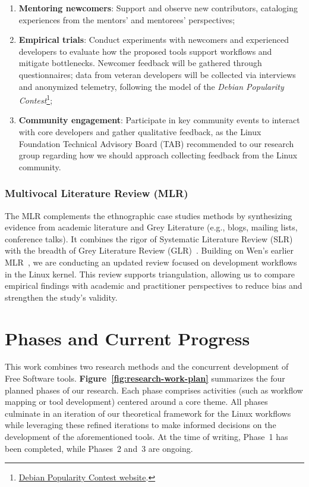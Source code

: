 \documentclass[sigconf]{acmart} %
\begin{document}
\begin{enumerate}
    \item \textbf{Mentoring newcomers}: Support and observe new contributors,
    cataloging experiences from the mentors' and mentorees' perspectives;
    \item \textbf{Empirical trials}: Conduct experiments with newcomers and
    experienced developers to evaluate how the proposed tools support workflows
    and mitigate bottlenecks. Newcomer feedback will be gathered through
    questionnaires; data from veteran developers will be collected via
    interviews and anonymized telemetry, following the model of the
    \textit{Debian Popularity
    Contest}\footnote{\href{https://popcon.debian.org/}{Debian Popularity
    Contest website}.};
    \item \textbf{Community engagement}: Participate in key community events to
    interact with core developers and gather qualitative feedback, as the Linux
    Foundation Technical Advisory Board (TAB) recommended to our research group
    regarding how we should approach collecting feedback from the Linux
    community.
\end{enumerate}

\subsubsection{Multivocal Literature Review (MLR)}

The MLR complements the ethnographic case studies methods by synthesizing
evidence from academic literature and Grey Literature (e.g., blogs, mailing
lists, conference talks). It combines the rigor of Systematic Literature Review
(SLR) with the breadth of Grey Literature Review (GLR)~\cite{vahid2018-mlr}.
Building on Wen's earlier MLR~\cite{wen2021-masterthesis}, we are conducting an
updated review focused on development workflows in the Linux kernel. This review
supports triangulation, allowing us to compare empirical findings with academic
and practitioner perspectives to reduce bias and strengthen the study's
validity.

\section{Phases and Current Progress}
\label{chp:workplan-schedule}

This work combines two research methods and the concurrent development of Free
Software tools. \textbf{Figure~\ref{fig:research-work-plan}} summarizes the four
planned phases of our research. Each phase comprises activities (such as
workflow mapping or tool development) centered around a core theme. All phases
culminate in an iteration of our theoretical framework for the Linux workflows
while leveraging these refined iterations to make informed decisions on the
development of the aforementioned tools. At the time of writing, Phase~1 has
been completed, while Phases~2 and~3 are ongoing.
\end{document}
